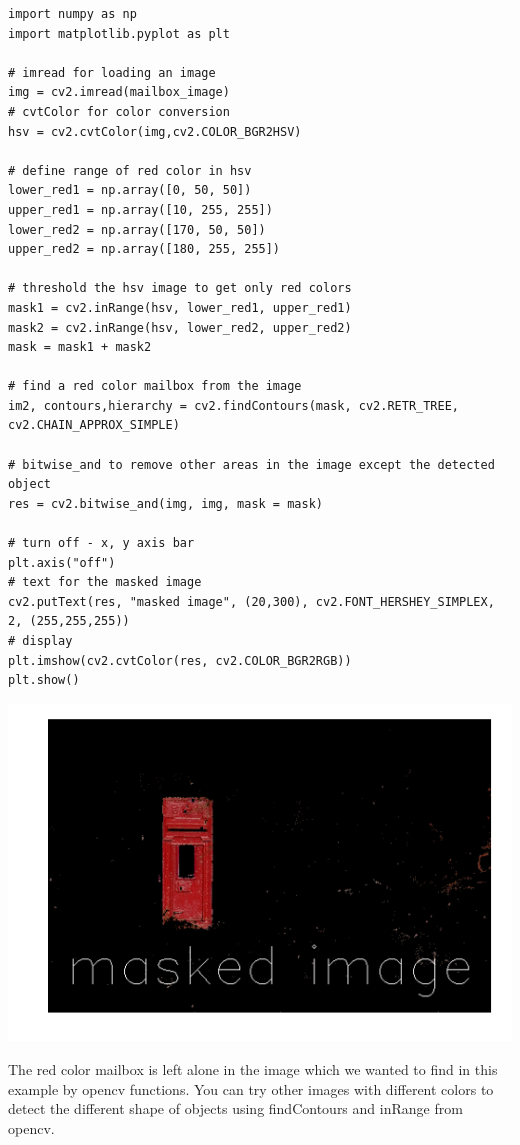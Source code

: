 \begin{verbatim}
import numpy as np
import matplotlib.pyplot as plt

# imread for loading an image
img = cv2.imread(mailbox_image)
# cvtColor for color conversion
hsv = cv2.cvtColor(img,cv2.COLOR_BGR2HSV)

# define range of red color in hsv
lower_red1 = np.array([0, 50, 50])
upper_red1 = np.array([10, 255, 255])
lower_red2 = np.array([170, 50, 50])
upper_red2 = np.array([180, 255, 255])

# threshold the hsv image to get only red colors
mask1 = cv2.inRange(hsv, lower_red1, upper_red1)
mask2 = cv2.inRange(hsv, lower_red2, upper_red2)
mask = mask1 + mask2

# find a red color mailbox from the image
im2, contours,hierarchy = cv2.findContours(mask, cv2.RETR_TREE, cv2.CHAIN_APPROX_SIMPLE)

# bitwise_and to remove other areas in the image except the detected object
res = cv2.bitwise_and(img, img, mask = mask)

# turn off - x, y axis bar
plt.axis("off")
# text for the masked image
cv2.putText(res, "masked image", (20,300), cv2.FONT_HERSHEY_SIMPLEX, 2, (255,255,255))
# display
plt.imshow(cv2.cvtColor(res, cv2.COLOR_BGR2RGB))
plt.show()
\end{verbatim}

\includegraphics{facedetection_files/facedetection_49_0.png}

The red color mailbox is left alone in the image which we wanted to find
in this example by opencv functions. You can try other images with
different colors to detect the different shape of objects using
findContours and inRange from opencv.


